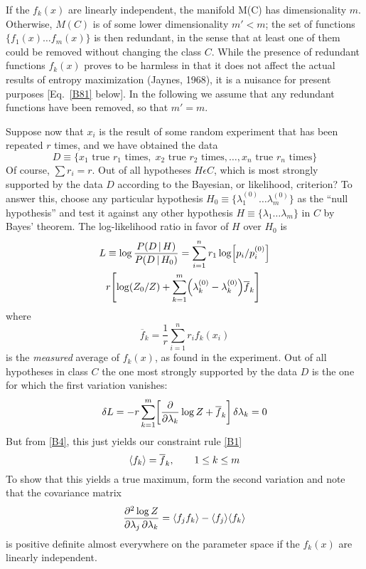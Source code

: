 {If the $f_k(x)$ are linearly independent, the manifold M(C) has dimensionality $m$.
Otherwise, $M(C)$ is of some lower dimensionality $m'<m$;
the set of functions $\{f_1(x) \ldots f_m(x)\}$ is then redundant, in the sense that at least one of them could be removed without changing the class $C$.
While the presence of redundant functions $f_k(x)$ proves to be harmless in that it does not affect the actual results of entropy maximization (Jaynes, \cite{jaynes68}{1968}), it is a nuisance for present purposes [Eq.~\eqref{B81} below].
In the following we assume that any redundant functions have been removed, so that $m' = m$.

Suppose now that $x_i$ is the result of some random experiment that has been repeated $r$ times, and we have obtained the data
\begin{equation}
	D \equiv \{x_1 \text{ true } r_1 \text{ times},\; x_2 \text{ true } r_2 \text{ times}, \ldots, x_n \text{ true } r_n \text{ times}\}
\end{equation}
Of course, $\sum r_i = r$.
Out of all hypotheses $H\epsilon C$, which is most strongly supported by the data $D$ according to the Bayesian, or likelihood, criterion?
To answer this, choose any particular hypothesis $H_0 \equiv \{\lambda^{(0)}_1\ldots \lambda^{(0)}_m\}$ as the ``null hypothesis'' and test it against any other hypothesis $H \equiv \{\lambda_1\ldots \lambda_m\}$ in $C$ by Bayes’ theorem.
The log-likelihood ratio in favor of $H$ over $H_0$ is
\begin{equation}
	\label{B77}
\begin{split}
	L
	& \equiv \log \frac{P(D\given H)}{P(D\given H_0)} = \sum_{i=1}^{n} r_1 \log \left[p_i/p^{(0)}_i\right]\\
	& r\left[\log(Z_0/Z) + \sum_{k=1}^{m} \left( \lambda^{(0)}_k - \lambda^{(0)}_k \right)\overline{f}_k \right]
\end{split}
\end{equation}
where
\begin{equation}
	\label{B78}
	\overline{f}_k = \frac{1}{r} \sum_{i=1}^{n} r_i f_k(x_i)
\end{equation}
is the \emph{measured} average of $f_k(x)$, as found in the experiment.
Out of all hypotheses in class $C$ the one most strongly supported by the data $D$ is the one for which the first variation vanishes:
\begin{equation}
	\label{B79}
	\ddel{L} = -r \sum_{k=1}^{m} \left[\pdv{}{\lambda_k} \log Z + \overline{f}_k\right] \ddel{\lambda_k} = 0
\end{equation}
But from \eqref{B4}, this just yields our constraint rule \eqref{B1}
\begin{equation}
	\label{B80}
	\langle f_k\rangle = \overline{f}_k,\qquad 1\leq k\leq m
\end{equation}
To show that this yields a true maximum, form the second variation and note that the covariance matrix
\begin{equation}
	\label{B81}
	\pdv{\log Z}{\lambda_j, \lambda_k} = \langle f_j f_k\rangle - \langle f_j\rangle \langle f_k\rangle
\end{equation}
is positive definite almost everywhere on the parameter space if the $f_k(x)$ are linearly independent.

}
